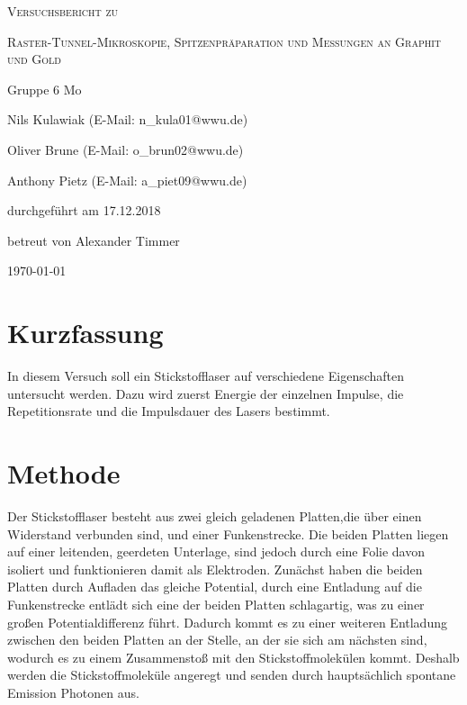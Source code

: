 \documentclass[
	a4paper,
	12pt,
	pagesize,
	ngerman
]{scrartcl}
\begin{document}
\begin{titlepage}
	\centering
	{\scshape\LARGE Versuchsbericht zu \par}
	\vspace{1cm}
	{\scshape\huge Raster-Tunnel-Mikroskopie, Spitzenpräparation und Messungen an Graphit und Gold     \par}
	\vspace{2.5cm}
	{\LARGE Gruppe 6 Mo\par}
	\vspace{0.5cm}
	{\large Nils Kulawiak (E-Mail: n\_kula01@wwu.de) \par}
	{\large Oliver Brune (E-Mail: o\_brun02@wwu.de) \par}
	{\large Anthony Pietz (E-Mail: a\_piet09@wwu.de) \par}
	\vfill
	durchgeführt am 17.12.2018\par
	
	\vfill
	betreut von Alexander Timmer\par
	
	\vfill
	{\large \today\par}
\end{titlepage}

\tableofcontents
\newpage

\section{Kurzfassung}
In diesem Versuch soll ein Stickstofflaser auf verschiedene Eigenschaften untersucht werden. Dazu wird zuerst Energie der einzelnen Impulse, die Repetitionsrate und die Impulsdauer des Lasers bestimmt.


\section{Methode}
Der Stickstofflaser besteht aus zwei gleich geladenen Platten,die über einen Widerstand verbunden sind, und einer Funkenstrecke. Die beiden Platten liegen auf einer leitenden, geerdeten Unterlage, sind jedoch durch eine Folie davon isoliert und funktionieren damit als Elektroden. Zunächst haben die beiden Platten durch Aufladen das gleiche Potential, durch eine Entladung auf die Funkenstrecke entlädt sich eine der beiden Platten schlagartig, was zu einer großen Potentialdifferenz führt. Dadurch kommt es zu einer weiteren Entladung zwischen den beiden Platten an der Stelle, an der sie sich am nächsten sind, wodurch es zu einem Zusammenstoß mit den Stickstoffmolekülen kommt. Deshalb werden die Stickstoffmoleküle angeregt und senden durch hauptsächlich spontane Emission Photonen aus. %
\end{document}
